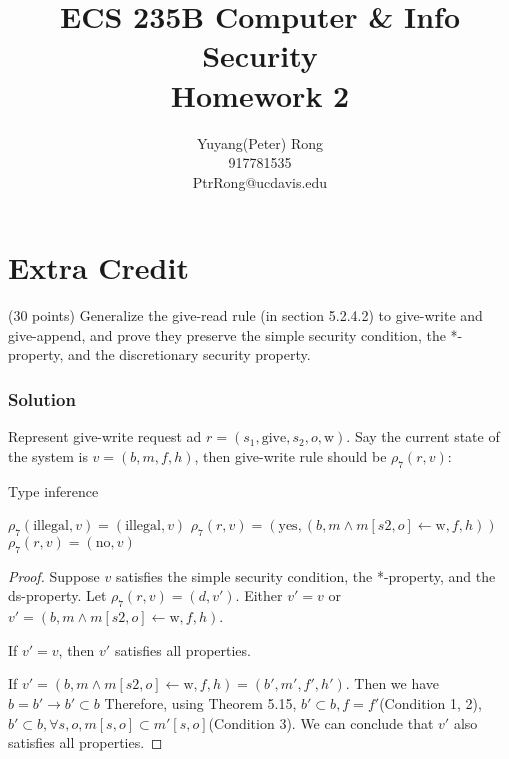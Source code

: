 \documentclass{article}
\title{ECS 235B Computer \& Info Security \\ Homework 2}
\author{Yuyang(Peter) Rong \\917781535 \\ PtrRong@ucdavis.edu}
\begin{document}
\maketitle

\section*{Extra Credit}
(30 points) Generalize the give-read rule (in section 5.2.4.2) to give-write and give-append, and prove they preserve the simple security condition, the *-property, and the discretionary security property.

\subsubsection*{Solution}

Represent give-write request ad $r=(s_1, \text{give}, s_2, o, \text{w})$.
Say the current state of the system is $v = (b, m, f, h)$, then give-write rule should be $\rho_7(r, v)$:
\begin{algorithm}[t]
    \caption{Type inference} \label{alg:typeInference}
    \begin{algorithmic}
            \State $\rho_7(\text{illegal}, v) = (\text{illegal}, v)$
        \Else {}
                \State $\rho_7(r, v) = (\text{yes}, (b, m \wedge m[s2, o] \leftarrow \text{w}, f, h))$
            \Else 
                \State  $\rho_7(r, v) = (\text{no}, v)$
            \EndIf
        \EndIf
    \end{algorithmic}
\end{algorithm}

\begin{proof}
    Suppose $v$ satisfies the simple security condition, the *-property, and the ds-property.
    Let $\rho_7(r, v) = (d, v')$. 
    Either $v' = v$ or $v' = (b, m \wedge m[s2, o] \leftarrow \text{w}, f, h)$.
    
    If $v' = v$, then $v'$ satisfies all properties.

    If $v' = (b, m \wedge m[s2, o] \leftarrow \text{w}, f, h) = (b', m', f', h')$. 
    Then we have $b = b' \rightarrow b' \subset b$
    Therefore, using Theorem 5.15, $b' \subset b, f = f'$(Condition 1, 2), $b' \subset b, \forall s, o, m[s, o] \subset m'[s, o]$(Condition 3).
    We can conclude that $v'$ also satisfies all properties.
\end{proof}
\end{document}
